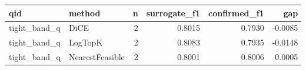 \begin{tabular}{llrrrr}
\toprule
         qid &          method &  n &  surrogate\_f1 &  confirmed\_f1 &     gap \\
\midrule
tight\_band\_q &            DiCE &  2 &        0.8015 &        0.7930 & -0.0085 \\
tight\_band\_q &         LogTopK &  2 &        0.8083 &        0.7935 & -0.0148 \\
tight\_band\_q & NearestFeasible &  2 &        0.8001 &        0.8006 &  0.0005 \\
\bottomrule
\end{tabular}
